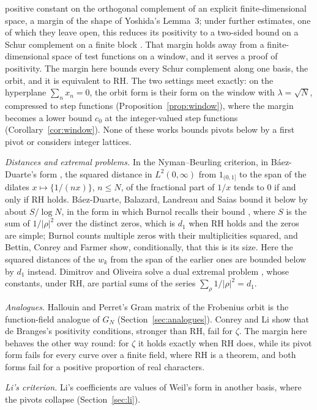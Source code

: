 \documentclass[11pt]{article}
\theoremstyle{definition}
\begin{document}
positive constant on the orthogonal complement of an explicit finite-dimensional space, a margin of the shape of
Yoshida's Lemma~3; under further estimates, one of which they leave open, this reduces its positivity to a two-sided
bound on a Schur complement on a finite block \cite[\S8]{acl26}. That margin holds away from a finite-dimensional
space of test functions on a window, and it serves a proof of positivity. The margin here bounds every Schur complement
along one basis, the orbit, and it is equivalent to RH. The two settings meet exactly: on the hyperplane $\sum_n x_n
= 0$, the orbit form is their form on the window with $\lambda = \sqrt N$, compressed to step functions
(Proposition~\ref{prop:window}), where the margin becomes a lower bound $c_0$ at the integer-valued step functions
(Corollary~\ref{cor:window}). None of these works bounds pivots below by a first pivot or considers integer lattices.

\emph{Distances and extremal problems.} In the Nyman--Beurling criterion, in Báez-Duarte's form \cite{baez-duarte03},
the squared distance in $L^2(0, \infty)$ from $1_{(0,1]}$ to the span of the dilates $x \mapsto \{1/(nx)\}$, $n \le N$,
of the fractional part of $1/x$ tends to $0$ if and only if RH holds. B\'aez-Duarte, Balazard, Landreau and Saias
\cite{bbls00} bound it below by about $S/\log N$, in the form in which Burnol recalls their bound \cite{burnol02},
where $S$ is the sum of $1/|\rho|^2$ over the distinct zeros, which is $d_1$ when RH holds and the zeros are simple;
Burnol counts multiple zeros with their multiplicities
squared, and Bettin, Conrey and Farmer \cite{bcf} show, conditionally, that this is its size. Here the squared distances
of the $w_k$ from the span of the earlier ones are bounded below by $d_1$ instead. Dimitrov and Oliveira solve a dual
extremal problem \cite{dimitrov-oliveira}, whose constants, under RH, are partial sums of the series $\sum_\rho
1/|\rho|^2 = d_1$.

\emph{Analogues.} Hallouin and Perret's Gram matrix of the Frobenius orbit \cite{hallouin-perret} is the function-field
analogue of $G_N$ (Section~\ref{sec:analogues}). Conrey and Li \cite{conrey-li} show that de Branges's positivity
conditions, stronger than RH, fail for $\zeta$. The margin
here behaves the other way round: for $\zeta$ it holds exactly
when RH does, while its pivot form fails for every curve over a finite field, where RH is a theorem, and both forms fail
for a positive proportion of real characters.

\emph{Li's criterion.} Li's coefficients \cite{li97} are values of Weil's form in another basis, where the pivots
collapse (Section~\ref{sec:li}).
\end{document}
